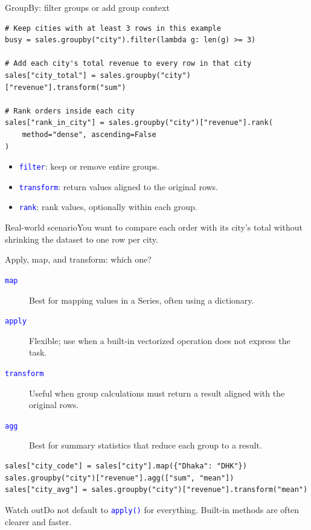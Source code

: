 \documentclass[aspectratio=169,10pt]{beamer}
\newcommand{\scenario}[1]{\begin{block}{Real-world scenario}#1\end{block}}
\newcommand{\pitfall}[1]{\begin{alertblock}{Watch out}#1\end{alertblock}}
\newcommand{\method}[1]{\texttt{\textcolor{Blue}{#1}}}
\begin{document}
\begin{frame}[fragile]{GroupBy: filter groups or add group context}
\begin{lstlisting}
# Keep cities with at least 3 rows in this example
busy = sales.groupby("city").filter(lambda g: len(g) >= 3)

# Add each city's total revenue to every row in that city
sales["city_total"] = sales.groupby("city")["revenue"].transform("sum")

# Rank orders inside each city
sales["rank_in_city"] = sales.groupby("city")["revenue"].rank(
    method="dense", ascending=False
)
\end{lstlisting}
\begin{itemize}
\item \method{filter}: keep or remove entire groups.
\item \method{transform}: return values aligned to the original rows.
\item \method{rank}: rank values, optionally within each group.
\end{itemize}
\scenario{You want to compare each order with its city's total without shrinking the dataset to one row per city.}
\end{frame}

\begin{frame}[fragile]{Apply, map, and transform: which one?}
\begin{description}
\item[\method{map}] Best for mapping values in a Series, often using a dictionary.
\item[\method{apply}] Flexible; use when a built-in vectorized operation does not express the task.
\item[\method{transform}] Useful when group calculations must return a result aligned with the original rows.
\item[\method{agg}] Best for summary statistics that reduce each group to a result.
\end{description}
\begin{lstlisting}
sales["city_code"] = sales["city"].map({"Dhaka": "DHK"})
sales.groupby("city")["revenue"].agg(["sum", "mean"])
sales["city_avg"] = sales.groupby("city")["revenue"].transform("mean")
\end{lstlisting}
\pitfall{Do not default to \method{apply()} for everything. Built-in methods are often clearer and faster.}
\end{frame}
\end{document}
